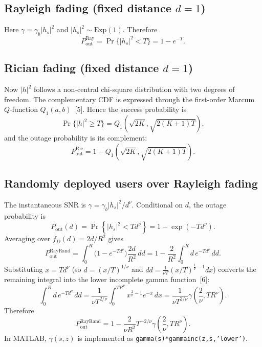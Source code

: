 \documentclass[12pt,a4paper]{article}
\begin{document}
\subsection{Rayleigh fading (fixed distance $d=1$)}
Here $\gamma=\gamma_b|h_s|^2$ and $|h_s|^2\sim\text{Exp}(1)$. Therefore
\begin{equation}
    P_{\text{out}}^{\text{Ray}}=\Pr\{|h_s|^2<T\}=1-e^{-T}.
\end{equation}

\subsection{Rician fading (fixed distance $d=1$)}
Now $|h|^2$ follows a non-central chi-square distribution with two degrees of freedom. The complementary CDF is expressed through the first-order Marcum $Q$-function $Q_1(a,b)$~[5]. Hence the success probability is
\begin{equation}
    \Pr\{|h|^2\ge T\}=Q_1\!\left(\sqrt{2K},\sqrt{2(K+1)T}\right),
\end{equation}
and the outage probability is its complement:
\begin{equation}
    P_{\text{out}}^{\text{Ric}}=1-Q_1\!\left(\sqrt{2K},\sqrt{2(K+1)T}\right).
\end{equation}

\subsection{Randomly deployed users over Rayleigh fading}
The instantaneous SNR is $\gamma=\gamma_b|h_s|^2/d^{\nu}$. Conditional on $d$, the outage probability is
\begin{equation}
    P_{\text{out}}(d)=\Pr\left\{|h_s|^2<Td^{\nu}\right\}=1-\exp(-Td^{\nu}).
\end{equation}
Averaging over $f_D(d)=2d/R^2$ gives
\begin{equation}
    P_{\text{out}}^{\text{RayRand}}
    =\int_0^R\bigl(1-e^{-Td^{\nu}}\bigr)\frac{2d}{R^2}\,dd
    =1-\frac{2}{R^2}\int_0^R d\,e^{-Td^{\nu}}\,dd.
\end{equation}
Substituting $x=Td^{\nu}$ (so $d=(x/T)^{1/\nu}$ and $dd=\frac{1}{\nu T}(x/T)^{\frac{1}{\nu}-1}dx$) converts the remaining integral into the lower incomplete gamma function~[6]:
\begin{equation}
    \int_0^R d\,e^{-Td^{\nu}}\,dd
    =\frac{1}{\nu T^{2/\nu}}\int_0^{TR^{\nu}}x^{\frac{2}{\nu}-1}e^{-x}\,dx
    =\frac{1}{\nu T^{2/\nu}}\gamma\!\left(\frac{2}{\nu},TR^{\nu}\right).
\end{equation}
Therefore
\begin{equation}
    P_{\text{out}}^{\text{RayRand}}
    =1-\frac{2}{\nu R^2}T^{-2/\nu}\gamma\!\left(\frac{2}{\nu},TR^{\nu}\right).
\end{equation}
In MATLAB, $\gamma(s,z)$ is implemented as \texttt{gamma(s)*gammainc(z,s,'lower')}.
\end{document}
